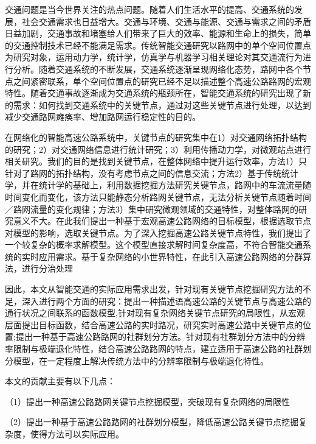 
\begin{cabstract}

		交通问题是当今世界关注的热点问题。随着人们生活水平的提高、交通系统的发展，社会交通需求也日益增大。交通与环境、交通与能源、交通与需求之间的矛盾日益加剧，交通事故和堵塞给人们带来了巨大的效率、能源和生命上的损失，简单的交通控制技术已经不能满足需求。传统智能交通研究以路网中的单个空间位置点为研究对象，运用动力学，统计学，仿真学与机器学习相关理论对其交通流行为进行分析。随着交通系统的不断发展，交通系统逐渐呈现网络化态势，路网中各个节点之间紧密联系，单个空间位置点的研究已经不足以描述整个高速公路路网的宏观特性。随着交通事故逐渐成为交通系统的瓶颈所在，智能交通系统的研究出现了新的需求：如何找到交通系统中的关键节点，通过对这些关键节点进行处理，以达到减少交通路网瘫痪率、增加路网运行稳定性的目的。

		在网络化的智能高速公路系统中，关键节点的研究集中在1）对交通网络拓扑结构的研究；2）对交通网络信息进行统计研究；3）利用传播动力学，对微观站点进行相关研究。我们的目的是找到关键节点，在整体网络中提升运行效率，方法1）只针对了路网的拓扑结构，没有考虑节点之间的信息交流；方法2）基于传统统计学，并在统计学的基础上，利用数据挖掘方法研究关键节点，路网中的车流流量随时间变化而变化，该方法只能静态分析路网关键节点，无法分析关键节点随着时间／路网流量的变化规律；方法3）集中研究微观领域的交通特性，对整体路网的研究意义不大。在此我们提出一种基于宏观高速公路网络的目标模型，根据选取节点对模型的影响，选取关键节点。为了深入挖掘高速公路关键节点特性，我们提出了一个较复杂的概率求解模型。这个模型直接求解时间复杂度高，不符合智能交通系统的实时应用需求。基于复杂网络的小世界特性，在此引入高速公路网络的分群算法，进行分治处理

		因此，本文从智能交通的实际应用需求出发，针对现有关键节点挖掘研究方法的不足，深入进行两个方面的研究：提出一种描述语高速公路的关键节点与高速公路的通行状况之间联系的函数模型,针对现有复杂网络关键节点研究的局限性，从宏观层面提出目标函数，结合高速公路的实时路况，研究实时高速公路中关键节点的位置;提出一种基于高速公路路网的社群划分方法。针对现有社群划分方法中的分辨率限制与极端退化特性，结合高速公路路网的特点，建立适用于高速公路的社群划分模型，在一定程度上解决传统方法中的分辨率限制与极端退化特性。

        本文的贡献主要有以下几点：
        
		（1）提出一种高速公路路网关键节点挖掘模型，突破现有复杂网络的局限性
		
		（2）提出一种基于高速公路路网的社群划分模型，降低高速公路关键节点挖掘复杂度，使得方法可以实际应用。
\end{cabstract}

